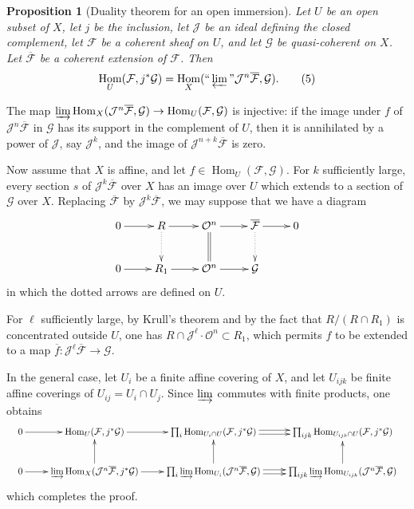 \documentclass[12pt]{amsart}
\theoremstyle{plain}
\newtheorem{prop}{Proposition}
\theoremstyle{definition}
\DeclareMathOperator{\Hom}{Hom}
\newcommand{\cF}{\mathcal{F}}
\newcommand{\cG}{\mathcal{G}}
\newcommand{\cJ}{\mathcal{J}}
\newcommand{\cO}{\mathcal{O}}
\begin{document}
\begin{prop}[Duality theorem for an open immersion]
Let $U$ be an open subset of $X$, let $j$ be the inclusion, let $\cJ$ be an ideal defining the closed complement, let $\cF$ be a coherent sheaf on $U$, and let $\cG$ be quasi-coherent on $X$. Let $\overline{\cF}$ be a coherent extension of $\cF$. Then
\begin{equation*}
\Hom_U(\cF,j^*\cG)=\Hom_X(\text{``}\varprojlim\text{''}\cJ^n\overline{\cF},\cG).
\tag*{\textup{(5)}}
\end{equation*}
\setcounter{footnote}{5}
\end{prop}

The map $\varinjlim\Hom_X(\cJ^n\overline{\cF},\cG)\to\Hom_U(\cF,\cG)$ is injective: if the image under $f$ of $\cJ^n\overline{\cF}$ in $\cG$ has its support in the complement of $U$, then it is annihilated by a power of $\cJ$, say $\cJ^k$, and the image of $\cJ^{n+k}\overline{\cF}$ is zero.

Now assume that $X$ is affine, and let $f\in\Hom_U(\cF,\cG)$. For $k$ sufficiently large, every section $s$ of $\cJ^k\overline{\cF}$ over $X$ has an image over $U$ which extends to a section of $\cG$ over $X$. Replacing $\overline{\cF}$ by $\cJ^k\overline{\cF}$, we may suppose that we have a diagram
\[
\xymatrix{
0 \ar[r] & R \ar[r] \ar@{.>}[d] & \cO^{n} \ar[r] \ar@{=}[d] & \overline{\cF} \ar[r] \ar@{.>}[d] & 0 \\
0 \ar[r] & R_1 \ar[r] & \cO^{n} \ar[r] & \cG &
}
\]
in which the dotted arrows are defined on $U$.

For $\ell$ sufficiently large, by Krull's theorem and by the fact that $R/(R\cap R_1)$ is concentrated outside $U$, one has $R\cap\cJ^\ell\cdot\cO^n\subset R_1$, which permits $f$ to be extended to a map $\overline f:\cJ^\ell\overline{\cF}\to\cG$.

In the general case, let $U_i$ be a finite affine covering of $X$, and let $U_{ijk}$ be finite affine coverings of $U_{ij}=U_i\cap U_j$. Since $\varinjlim$ commutes with finite products, one obtains
\[
\resizebox{\textwidth}{!}{$\xymatrix{
0 \ar[r] & \Hom_U(\cF,j^*\cG) \ar[r] & \prod_i \Hom_{U_i\cap U}(\cF,j^*\cG) \ar@<.5ex>[r] \ar@<-.5ex>[r] & \prod_{ijk}\Hom_{U_{ijk}\cap U}(\cF,j^*\cG) \\
0 \ar[r] & \varinjlim\Hom_X(\cJ^n\overline{\cF},j^*\cG) \ar[r] \ar[u] & \prod_i\varinjlim\Hom_{U_i}(\cJ^n\overline{\cF},\cG) \ar@<.5ex>[r] \ar@<-.5ex>[r] \ar[u] & \prod_{ijk}\varinjlim\Hom_{U_{ijk}}(\cJ^n\overline{\cF},\cG) \ar[u]
}$}
\]
which completes the proof.
\end{document}
